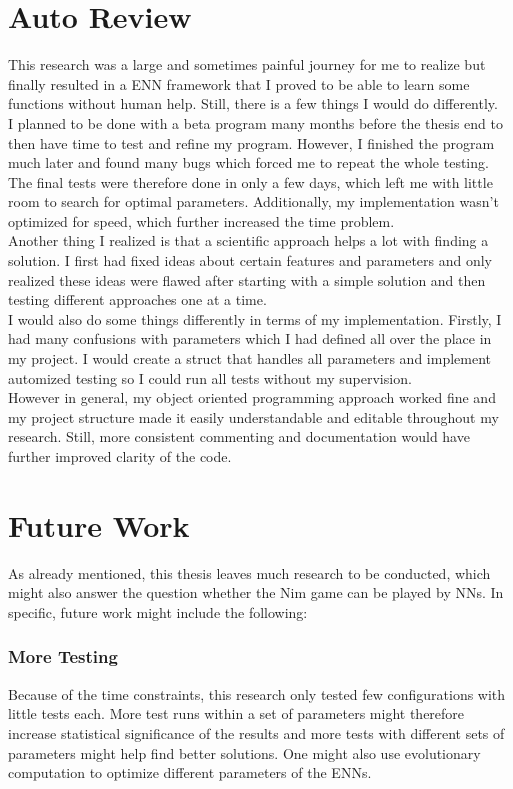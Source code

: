 \documentclass[11pt]{report}
\begin{document}
\begin{enumerate}
    \section{Auto Review}\label{sec:auto-review}
    This research was a large and sometimes painful journey for me to realize but finally resulted in a ENN framework that I proved to be able to learn some functions without human help.
    Still, there is a few things I would do differently.
    \\
    I planned to be done with a beta program many months before the thesis end to then have time to test and refine my program.
    However, I finished the program much later and found many bugs which forced me to repeat the whole testing.
    The final tests were therefore done in only a few days, which left me with little room to search for optimal parameters.
    Additionally, my implementation wasn't optimized for speed, which further increased the time problem.
    \\
    Another thing I realized is that a scientific approach helps a lot with finding a solution.
    I first had fixed ideas about certain features and parameters and only realized these ideas were flawed after starting with a simple solution and then testing different approaches one at a time.
    \\
    I would also do some things differently in terms of my implementation.
    Firstly, I had many confusions with parameters which I had defined all over the place in my project.
    I would create a struct that handles all parameters and implement automized testing so I could run all tests without my supervision.
    \\
    However in general, my object oriented programming approach worked fine and my project structure made it easily understandable and editable throughout my research.
    Still, more consistent commenting and documentation would have further improved clarity of the code.


    \section{Future Work}\label{sec:future-work}
    As already mentioned, this thesis leaves much research to be conducted, which might also answer the question whether the Nim game can be played by NNs.
    In specific, future work might include the following:

    \subsubsection{More Testing}
    Because of the time constraints, this research only tested few configurations with little tests each.
    More test runs within a set of parameters might therefore increase statistical significance of the results and more tests with different sets of parameters might help find better solutions.
    One might also use evolutionary computation to optimize different parameters of the ENNs.


\end{enumerate}
\end{document}
